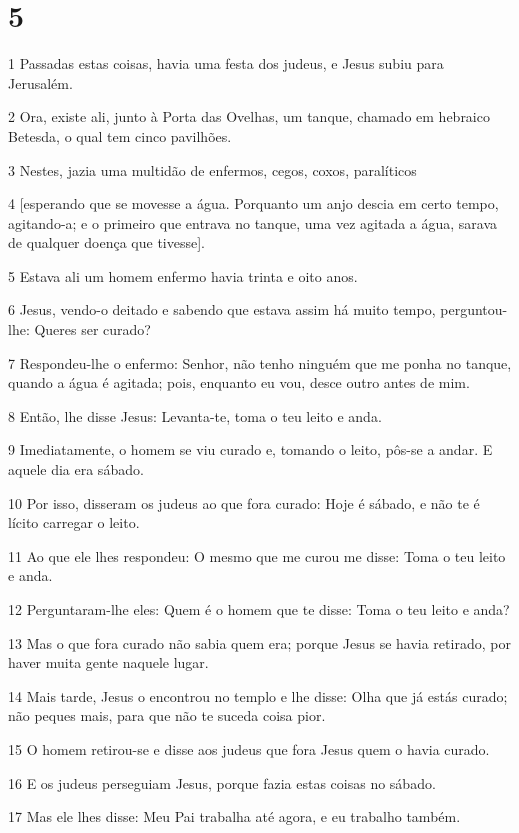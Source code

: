 \chapter{5}

\par 1 Passadas estas coisas, havia uma festa dos judeus, e Jesus subiu para Jerusalém.
\par 2 Ora, existe ali, junto à Porta das Ovelhas, um tanque, chamado em hebraico Betesda, o qual tem cinco pavilhões.
\par 3 Nestes, jazia uma multidão de enfermos, cegos, coxos, paralíticos
\par 4 [esperando que se movesse a água. Porquanto um anjo descia em certo tempo, agitando-a; e o primeiro que entrava no tanque, uma vez agitada a água, sarava de qualquer doença que tivesse].
\par 5 Estava ali um homem enfermo havia trinta e oito anos.
\par 6 Jesus, vendo-o deitado e sabendo que estava assim há muito tempo, perguntou-lhe: Queres ser curado?
\par 7 Respondeu-lhe o enfermo: Senhor, não tenho ninguém que me ponha no tanque, quando a água é agitada; pois, enquanto eu vou, desce outro antes de mim.
\par 8 Então, lhe disse Jesus: Levanta-te, toma o teu leito e anda.
\par 9 Imediatamente, o homem se viu curado e, tomando o leito, pôs-se a andar. E aquele dia era sábado.
\par 10 Por isso, disseram os judeus ao que fora curado: Hoje é sábado, e não te é lícito carregar o leito.
\par 11 Ao que ele lhes respondeu: O mesmo que me curou me disse: Toma o teu leito e anda.
\par 12 Perguntaram-lhe eles: Quem é o homem que te disse: Toma o teu leito e anda?
\par 13 Mas o que fora curado não sabia quem era; porque Jesus se havia retirado, por haver muita gente naquele lugar.
\par 14 Mais tarde, Jesus o encontrou no templo e lhe disse: Olha que já estás curado; não peques mais, para que não te suceda coisa pior.
\par 15 O homem retirou-se e disse aos judeus que fora Jesus quem o havia curado.
\par 16 E os judeus perseguiam Jesus, porque fazia estas coisas no sábado.
\par 17 Mas ele lhes disse: Meu Pai trabalha até agora, e eu trabalho também.
